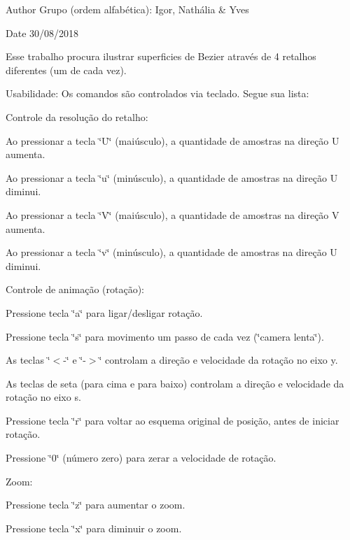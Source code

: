 \begin{DoxyAuthor}{Author}
Grupo (ordem alfabética)\+: Igor, Nathália \& Yves
\end{DoxyAuthor}
\begin{DoxyDate}{Date}
30/08/2018
\end{DoxyDate}
Esse trabalho procura ilustrar superficies de Bezier através de 4 retalhos diferentes (um de cada vez).

Usabilidade\+: Os comandos são controlados via teclado. Segue sua lista\+:

Controle da resolução do retalho\+:
\begin{DoxyItemize}
\item Ao pressionar a tecla \char`\"{}\+U\char`\"{} (maiúsculo), a quantidade de amostras na direção U aumenta.
\item Ao pressionar a tecla \char`\"{}u\char`\"{} (minúsculo), a quantidade de amostras na direção U diminui.
\item Ao pressionar a tecla \char`\"{}\+V\char`\"{} (maiúsculo), a quantidade de amostras na direção V aumenta.
\item Ao pressionar a tecla \char`\"{}v\char`\"{} (minúsculo), a quantidade de amostras na direção U diminui.
\end{DoxyItemize}

Controle de animação (rotação)\+:
\begin{DoxyItemize}
\item Pressione tecla \char`\"{}a\char`\"{} para ligar/desligar rotação.
\item Pressione tecla \char`\"{}s\char`\"{} para movimento um passo de cada vez (\char`\"{}camera lenta\char`\"{}).
\item As teclas \char`\"{}$<$-\/\char`\"{} e \char`\"{}-\/$>$\char`\"{} controlam a direção e velocidade da rotação no eixo y.
\item As teclas de seta (para cima e para baixo) controlam a direção e velocidade da rotação no eixo s.
\item Pressione tecla \char`\"{}r\char`\"{} para voltar ao esquema original de posição, antes de iniciar rotação.
\item Pressione \char`\"{}0\char`\"{} (número zero) para zerar a velocidade de rotação.
\end{DoxyItemize}

Zoom\+:
\begin{DoxyItemize}
\item Pressione tecla \char`\"{}z\char`\"{} para aumentar o zoom.
\item Pressione tecla \char`\"{}x\char`\"{} para diminuir o zoom.
\end{DoxyItemize}

